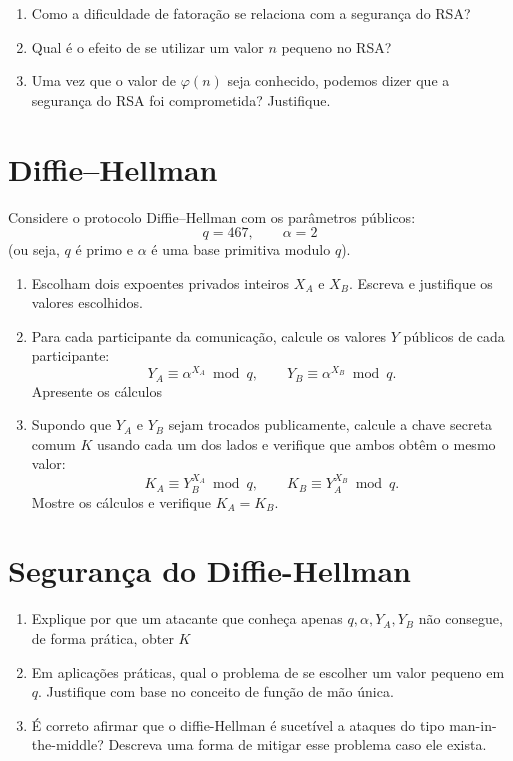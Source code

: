 \begin{enumerate}
    \item Como a dificuldade de fatoração se relaciona com a segurança do RSA?
    \item Qual é o efeito de se utilizar um valor $n$ pequeno no RSA?
    \item Uma vez que o valor de $\varphi(n)$ seja conhecido, podemos dizer que a segurança do RSA foi comprometida? Justifique.
\end{enumerate}

\section{Diffie–Hellman}

Considere o protocolo Diffie–Hellman com os parâmetros públicos:
\[
    q = 467,\qquad \alpha = 2
\]
(ou seja, \(q\) é primo e \(\alpha\) é uma base primitiva modulo \(q\)).

\begin{enumerate}
    \item Escolham dois expoentes privados inteiros \(X_A\) e \(X_B\). Escreva e justifique os valores escolhidos.
    \item Para cada participante da comunicação, calcule os valores $Y$ públicos de cada participante:
          \[
              Y_A \equiv \alpha^{X_A} \bmod q,\qquad Y_B \equiv \alpha^{X_B} \bmod q.
          \]
          Apresente os cálculos
    \item Supondo que \(Y_A\) e \(Y_B\) sejam trocados publicamente, calcule a chave secreta comum \(K\) usando cada um dos lados e verifique que ambos obtêm o mesmo valor:
          \[
              K_A \equiv Y_B^{X_A} \bmod q,\qquad K_B \equiv Y_A^{X_B} \bmod q.
          \]
          Mostre os cálculos e verifique \(K_A = K_B\).


\end{enumerate}

\section{Segurança do Diffie-Hellman}
\begin{enumerate}
    \item Explique por que um atacante que conheça apenas \(q,\alpha,Y_A,Y_B\) não consegue, de forma prática, obter \(K\)
    \item Em aplicações práticas, qual o problema de se escolher um valor pequeno em  $q$. Justifique com base no conceito de função de mão única.
    \item É correto afirmar que o diffie-Hellman é sucetível a ataques do tipo man-in-the-middle? Descreva uma forma de mitigar esse problema caso ele exista.
\end{enumerate}

